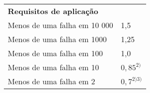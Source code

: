 \begin{table}
\centering
{}
\begin{tabular}{ll}
\textbf{Requisitos de aplicação}      & \textbf{$Y_Z \\ ^{1)}$    \\
Menos de uma falha em 10 000 & 1,5       \\
Menos de uma falha em 1000   & 1,25      \\
Menos de uma falha em 100    & 1,0       \\
Menos de uma falha em 10     & $0,85 ^{2)}$   \\
Menos de uma falha em 2      & $0,7^{2) 3)}$
\end{tabular}
\end{table}